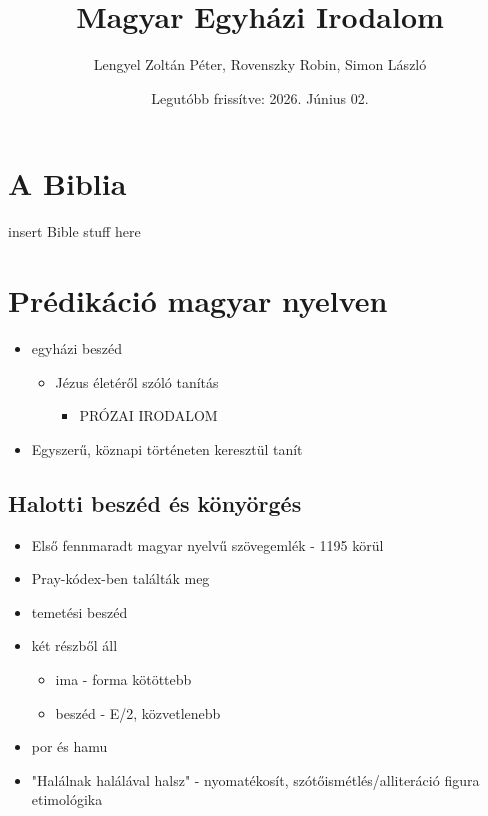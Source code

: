 \documentclass{article}
\title{Magyar Egyházi Irodalom}
\author{Lengyel Zoltán Péter, Rovenszky Robin, Simon László}
\date{Legutóbb frissítve: 2026. Június 02.}
\begin{document}
\maketitle
\tableofcontents
\newpage

\section{A Biblia}
insert Bible stuff here 


\section{Prédikáció magyar nyelven}
\begin{itemize}
    \item egyházi beszéd \begin{itemize}
        \item Jézus életéről szóló tanítás \begin{itemize}
            \item PRÓZAI IRODALOM
        \end{itemize}
    \end{itemize}
    \item Egyszerű, köznapi történeten keresztül tanít
\end{itemize}

\subsection{Halotti beszéd és könyörgés}
\begin{itemize}
    \item Első fennmaradt magyar nyelvű szövegemlék - 1195 körül
    \item Pray-kódex-ben találták meg
    \item temetési beszéd
    \item két részből áll \begin{itemize}
        \item ima - forma kötöttebb
        \item beszéd - E/2, közvetlenebb
    \end{itemize}
    \item por és hamu 
    \item "Halálnak halálával halsz" - nyomatékosít, szótőismétlés/alliteráció figura etimológika
    
\end{itemize}
\end{document}
